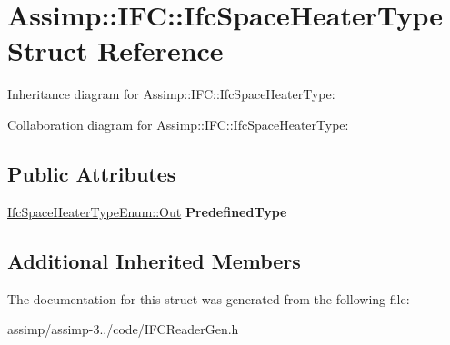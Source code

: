 \hypertarget{struct_assimp_1_1_i_f_c_1_1_ifc_space_heater_type}{\section{Assimp\+:\+:I\+F\+C\+:\+:Ifc\+Space\+Heater\+Type Struct Reference}
\label{struct_assimp_1_1_i_f_c_1_1_ifc_space_heater_type}
}


Inheritance diagram for Assimp\+:\+:I\+F\+C\+:\+:Ifc\+Space\+Heater\+Type\+:


Collaboration diagram for Assimp\+:\+:I\+F\+C\+:\+:Ifc\+Space\+Heater\+Type\+:
\subsection*{Public Attributes}
\begin{DoxyCompactItemize}
\item 
\hypertarget{struct_assimp_1_1_i_f_c_1_1_ifc_space_heater_type_a034b4e888db1a2a47e93e927127afec6}{\hyperlink{classboost_1_1shared__ptr}{Ifc\+Space\+Heater\+Type\+Enum\+::\+Out} {\bfseries Predefined\+Type}}\label{struct_assimp_1_1_i_f_c_1_1_ifc_space_heater_type_a034b4e888db1a2a47e93e927127afec6}

\end{DoxyCompactItemize}
\subsection*{Additional Inherited Members}


The documentation for this struct was generated from the following file\+:\begin{DoxyCompactItemize}
\item 
assimp/assimp-\/3../code/I\+F\+C\+Reader\+Gen.\+h\end{DoxyCompactItemize}
